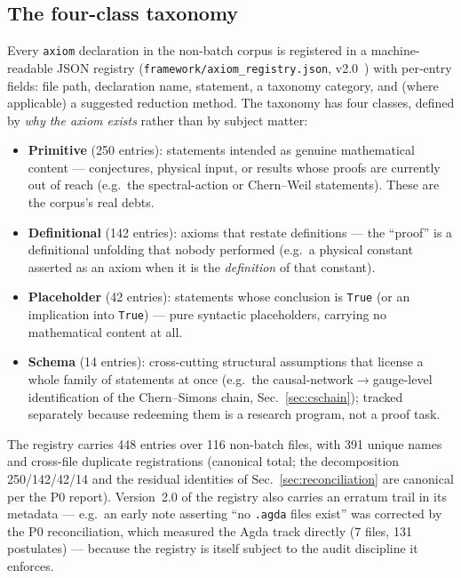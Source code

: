 \subsection{The four-class taxonomy}
\label{sec:taxonomy}
Every \texttt{axiom} declaration in the non-batch corpus is
registered in a machine-readable JSON registry
(\texttt{framework/axiom\_registry.json}, v2.0~\cite{sylvaregistry2026}) with per-entry
fields: file path, declaration name, statement, a taxonomy category,
and (where applicable) a suggested reduction method. The taxonomy
has four classes, defined by \emph{why the axiom exists} rather than
by subject matter:

\begin{itemize}
\item \textbf{Primitive} (250 entries): statements intended as
genuine mathematical content --- conjectures, physical input,
or results whose proofs are currently out of reach (e.g.\ the
spectral-action or Chern--Weil statements). These are the corpus's
real debts.
\item \textbf{Definitional} (142 entries): axioms that restate
definitions --- the ``proof'' is a definitional unfolding that
nobody performed (e.g.\ a physical constant asserted as an axiom
when it is the \emph{definition} of that constant).
\item \textbf{Placeholder} (42 entries): statements whose conclusion
is \texttt{True} (or an implication into \texttt{True}) --- pure
syntactic placeholders, carrying no mathematical content at all.
\item \textbf{Schema} (14 entries): cross-cutting structural
assumptions that license a whole family of statements at once
(e.g.\ the causal-network$\to$gauge-level identification of the
Chern--Simons chain, Sec.~\ref{sec:cschain}); tracked separately
because redeeming them is a research program, not a proof task.
\end{itemize}

The registry carries 448 entries over 116 non-batch files, with 391
unique names and  cross-file duplicate registrations
(canonical total; the decomposition 250/142/42/14 and the
residual identities of Sec.~\ref{sec:reconciliation} are canonical
per the P0 report). Version~2.0 of the registry also carries an
erratum trail in its metadata --- e.g.\ an early note asserting
``no \texttt{.agda} files exist'' was corrected by the P0
reconciliation, which measured the Agda track directly (7 files,
131 postulates) --- because the registry is itself subject to the
audit discipline it enforces.

